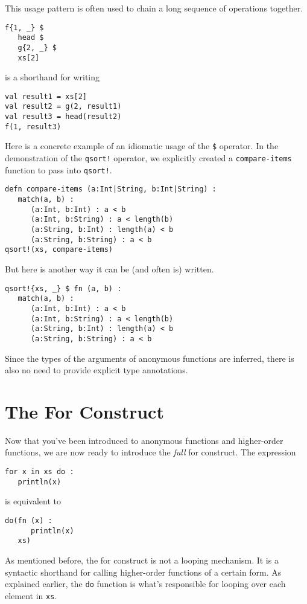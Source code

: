 \documentclass[10pt,oneside]{book}
\begin{document}
This usage pattern is often used to chain a long sequence of operations together.
\begin{lstlisting}
f{1, _} $
   head $
   g{2, _} $
   xs[2]
\end{lstlisting}
is a shorthand for writing
\begin{lstlisting}
val result1 = xs[2]
val result2 = g(2, result1)
val result3 = head(result2)
f(1, result3)
\end{lstlisting}

Here is a concrete example of an idiomatic usage of the \texttt{\frenchspacing \$} operator. In the demonstration of the \texttt{\frenchspacing qsort!} operator, we explicitly created a \texttt{\frenchspacing compare-items} function to pass into \texttt{\frenchspacing qsort!}.
\begin{lstlisting}
defn compare-items (a:Int|String, b:Int|String) :
   match(a, b) :
      (a:Int, b:Int) : a < b
      (a:Int, b:String) : a < length(b)
      (a:String, b:Int) : length(a) < b
      (a:String, b:String) : a < b
qsort!(xs, compare-items)
\end{lstlisting}
But here is another way it can be (and often is) written.
\begin{lstlisting}
qsort!{xs, _} $ fn (a, b) :
   match(a, b) :
      (a:Int, b:Int) : a < b
      (a:Int, b:String) : a < length(b)
      (a:String, b:Int) : length(a) < b
      (a:String, b:String) : a < b   
\end{lstlisting}
Since the types of the arguments of anonymous functions are inferred, there is also no need to provide explicit type annotations.

\section{The For Construct}
Now that you've been introduced to anonymous functions and higher-order functions, we are now ready to introduce the {\em full} for construct. The expression
\begin{lstlisting}
for x in xs do :
   println(x)
\end{lstlisting}
is equivalent to
\begin{lstlisting}
do(fn (x) :
      println(x)
   xs)   
\end{lstlisting}
As mentioned before, the for construct is not a looping mechanism. It is a syntactic shorthand for calling higher-order functions of a certain form. As explained earlier, the \texttt{\frenchspacing do} function is what's responsible for looping over each element in \texttt{\frenchspacing xs}. 
\end{document}

